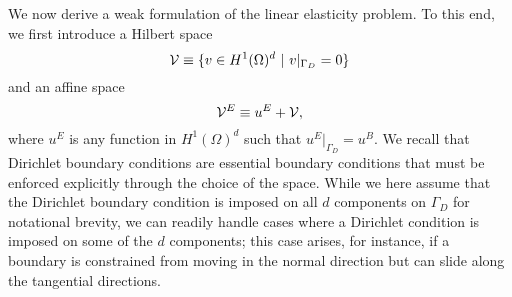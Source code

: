 We now derive a weak formulation of the linear elasticity problem.  To this end, we first introduce a Hilbert space
\begin{equation}
  \calV \equiv \{ v \in H^1(\Omega)^d \ | \ v|_{\Gamma_D} = 0 \}
  \label{eq:le_calV}
\end{equation}
and an affine space
\begin{equation*}
  \mathcal{V}^E \equiv u^E + \mathcal{V},
\end{equation*}
where $u^E$ is any function in $H^1(\Omega)^d$ such that $u^E|_{\Gamma_D} = u^B$.  We recall that Dirichlet boundary conditions are essential boundary conditions that must be enforced explicitly through the choice of the space. While we here assume that the Dirichlet boundary condition is imposed on all $d$ components on $\Gamma_D$ for notational brevity, we can readily handle cases where a Dirichlet condition is imposed on some of the $d$ components; this case arises, for instance, if a boundary is constrained from moving in the normal direction but can slide along the tangential directions.  

